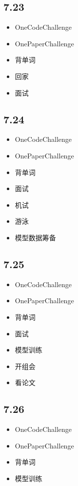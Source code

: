 \documentclass[UTF8]{ctexart}
\begin{document}
\subsection*{7.23}
\begin{itemize}
    \item OneCodeChallenge
    \item OnePaperChallenge
    \item 背单词
    \item 回家
    \item 面试
\end{itemize}

\subsection*{7.24}
\begin{itemize}
    \item OneCodeChallenge
    \item OnePaperChallenge
    \item 背单词
    \item 面试
    \item 机试
    \item 游泳
    \item 模型数据筹备
\end{itemize}

\subsection*{7.25}
\begin{itemize}
    \item OneCodeChallenge
    \item OnePaperChallenge
    \item 背单词
    \item 面试
    \item 模型训练
    \item 开组会
    \item 看论文
\end{itemize}

\subsection*{7.26}
\begin{itemize}
    \item OneCodeChallenge
    \item OnePaperChallenge
    \item 背单词
    \item 模型训练
\end{itemize}
\end{document}
